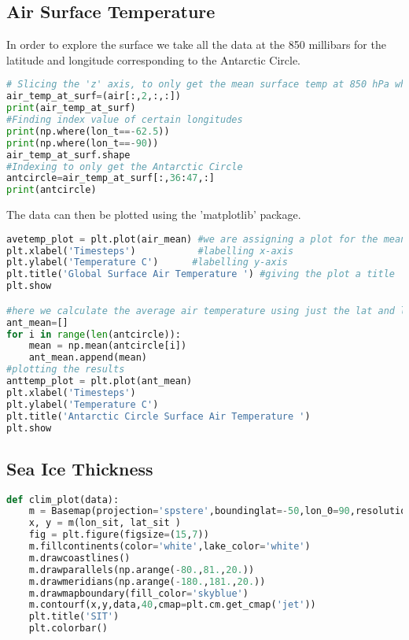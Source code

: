 \documentclass{article}
\begin{document}
\subsection{Air Surface Temperature}
In order to explore the surface we take all the data at the 850 millibars for the latitude and longitude corresponding to the Antarctic Circle. 
\begin{lstlisting}[language=Python]
# Slicing the 'z' axis, to only get the mean surface temp at 850 hPa where most convergence occurs
air_temp_at_surf=(air[:,2,:,:])
print(air_temp_at_surf)
#Finding index value of certain longitudes
print(np.where(lon_t==-62.5))
print(np.where(lon_t==-90))
air_temp_at_surf.shape
#Indexing to only get the Antarctic Circle
antcircle=air_temp_at_surf[:,36:47,:]
print(antcircle)
\end{lstlisting}
The data can then be plotted using the 'matplotlib' package. 
\begin{lstlisting}[language=Python]
avetemp_plot = plt.plot(air_mean) #we are assigning a plot for the mean air temperature
plt.xlabel('Timesteps')           #labelling x-axis
plt.ylabel('Temperature C')      #labelling y-axis
plt.title('Global Surface Air Temperature ') #giving the plot a title
plt.show

#here we calculate the average air temperature using just the lat and lon of the Antarctic Circle
ant_mean=[]
for i in range(len(antcircle)):
    mean = np.mean(antcircle[i])
    ant_mean.append(mean)
#plotting the results
anttemp_plot = plt.plot(ant_mean)
plt.xlabel('Timesteps')
plt.ylabel('Temperature C')
plt.title('Antarctic Circle Surface Air Temperature ')
plt.show
\end{lstlisting}

\subsection{Sea Ice Thickness}
\begin{lstlisting}[language=Python]
def clim_plot(data):
    m = Basemap(projection='spstere',boundinglat=-50,lon_0=90,resolution='l')
    x, y = m(lon_sit, lat_sit )
    fig = plt.figure(figsize=(15,7))
    m.fillcontinents(color='white',lake_color='white')
    m.drawcoastlines()
    m.drawparallels(np.arange(-80.,81.,20.))
    m.drawmeridians(np.arange(-180.,181.,20.))
    m.drawmapboundary(fill_color='skyblue')
    m.contourf(x,y,data,40,cmap=plt.cm.get_cmap('jet'))
    plt.title('SIT')
    plt.colorbar()
\end{lstlisting}
\end{document}

